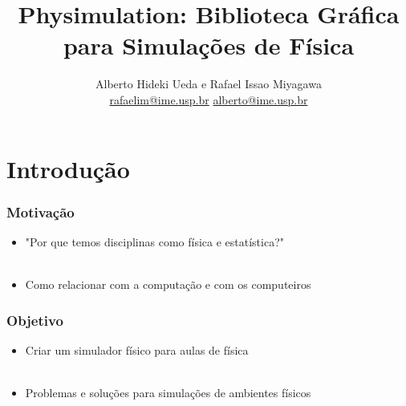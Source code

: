 \documentclass{beamer}
\title{Physimulation: Biblioteca Gráfica para Simulações de Física}
\author{Alberto Hideki Ueda e Rafael Issao Miyagawa\\ \url{rafaelim@ime.usp.br} \url{alberto@ime.usp.br}}
\institute{Instituto de Matemática e Estatística\\Universidade de São Paulo}
\begin{document}
\frame{\titlepage}
\frame{\tableofcontents}
\section{Introdução}
\begin{frame}
  \frametitle{Motivação}
  \begin{itemize}
    \item "Por que temos disciplinas como física e estatística?" \\ 
      \
    \item Como relacionar com a computação e com os computeiros
      \
  \end{itemize} 
\end{frame}
\begin{frame}
  \frametitle{Objetivo}
  \begin{itemize}
    \item Criar um simulador físico para aulas de física \\
      \
    \item Problemas e soluções para simulações de ambientes físicos \\
      \
  \end{itemize}
\end{frame}
\end{document}
